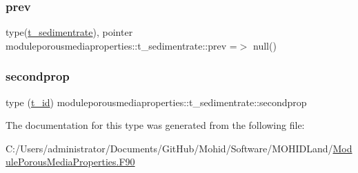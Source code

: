 \mbox{\label{structmoduleporousmediaproperties_1_1t__sedimentrate_adfeca96be5c6ab2640a6a7442a408044}} 
\subsubsection{\texorpdfstring{prev}{prev}}
{\footnotesize\ttfamily type(\mbox{\hyperlink{structmoduleporousmediaproperties_1_1t__sedimentrate}{t\+\_\+sedimentrate}}), pointer moduleporousmediaproperties\+::t\+\_\+sedimentrate\+::prev =$>$ null()\hspace{0.3cm}{\ttfamily [private]}}

\mbox{\label{structmoduleporousmediaproperties_1_1t__sedimentrate_a1cc55ce1b4cce0b55949030726dfddbb}} 
\subsubsection{\texorpdfstring{secondprop}{secondprop}}
{\footnotesize\ttfamily type (\mbox{\hyperlink{structmoduleporousmediaproperties_1_1t__id}{t\+\_\+id}}) moduleporousmediaproperties\+::t\+\_\+sedimentrate\+::secondprop\hspace{0.3cm}{\ttfamily [private]}}



The documentation for this type was generated from the following file\+:\begin{DoxyCompactItemize}
\item 
C\+:/\+Users/administrator/\+Documents/\+Git\+Hub/\+Mohid/\+Software/\+M\+O\+H\+I\+D\+Land/\mbox{\hyperlink{_module_porous_media_properties_8_f90}{Module\+Porous\+Media\+Properties.\+F90}}\end{DoxyCompactItemize}
